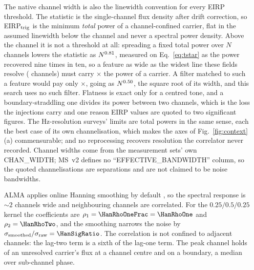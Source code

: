 The native channel width is also the linewidth convention for every EIRP
threshold. The statistic is the single-channel flux density after drift
correction, so EIRP$_{\rm trig}$ is the minimum \emph{total} power of a
channel-confined carrier, flat in the assumed linewidth below the channel and
never a spectral power density. Above the channel it is not a threshold at
all: spreading a fixed total power over $N$ channels lowers the statistic as
$N^{0.81}$, measured on Eq.~\ref{eq:tstar} as the power recovered nine
times in ten, so a feature as wide as the widest line these fields resolve
(\ScNBroadChan{} channels) must carry \ScNBroadRatio$\times$ the power of a
carrier. A filter matched to such a feature would pay only
\ScNBroadRatioMatched$\times$, going as $N^{0.50}$, the square
root of its width, and this search uses no such filter. Flatness is exact only for a centred tone,
and a boundary-straddling one divides its power between two channels, which
is the loss the injections carry and one reason EIRP values are quoted to two
significant figures. The Hz-resolution
surveys' limits are total powers in the same sense, each the best case of
its own channelisation, which makes the axes of Fig.~\ref{fig:context}(a)
commensurable; and no reprocessing recovers resolution the correlator never
recorded. Channel widths come from the measurement sets' own CHAN\_WIDTH;
MS~v2 defines no ``EFFECTIVE\_BANDWIDTH'' column, so the quoted
channelisations are separations and are not claimed to be noise bandwidths.

ALMA applies online Hanning smoothing by default \citep{ALMAHandbook}, so
the spectral response is ${\sim}2$ channels wide and neighbouring channels
are correlated. For the $0.25/0.5/0.25$ kernel the coefficients
are $\rho_1=\HanRhoOneFrac=\HanRhoOne$ and $\rho_2=\HanRhoTwo$, and the
smoothing narrows the noise by
$\sigma_{\rm smoothed}/\sigma_{\rm raw}=\HanSigRatio$. The correlation is
not confined to adjacent channels: the lag-two term is a sixth of the
lag-one term. The peak
channel holds \HanBest{} of an unresolved carrier's flux at a channel centre
and \HanWorst{} on a boundary, a median \HanMed{} over sub-channel phase.

